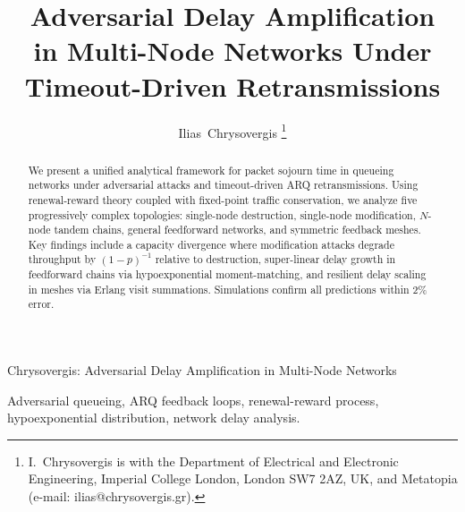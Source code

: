 \documentclass[journal,compsoc]{IEEEtran}
\begin{document}
\title{Adversarial Delay Amplification\\in Multi-Node Networks Under\\Timeout-Driven Retransmissions}

\author{Ilias~Chrysovergis%
\thanks{I.~Chrysovergis is with the Department of Electrical and Electronic Engineering, Imperial College London, London SW7 2AZ, UK, and Metatopia (e-mail: ilias@chrysovergis.gr).}}

%
{Chrysovergis: Adversarial Delay Amplification in Multi-Node Networks}

\maketitle

\begin{abstract}
We present a unified analytical framework for packet sojourn time in queueing networks under adversarial attacks and timeout-driven ARQ retransmissions. Using renewal-reward theory coupled with fixed-point traffic conservation, we analyze five progressively complex topologies: single-node destruction, single-node modification, $N$-node tandem chains, general feedforward networks, and symmetric feedback meshes. Key findings include a capacity divergence where modification attacks degrade throughput by $(1-p)^{-1}$ relative to destruction, super-linear delay growth in feedforward chains via hypoexponential moment-matching, and resilient delay scaling in meshes via Erlang visit summations. Simulations confirm all predictions within 2\% error.
\end{abstract}

\begin{IEEEkeywords}
Adversarial queueing, ARQ feedback loops, renewal-reward process, hypoexponential distribution, network delay analysis.
\end{IEEEkeywords}
\end{document}
